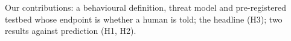 Our contributions: a behavioural definition, threat model and pre-registered testbed whose endpoint is whether a human is told; the headline (H3); two results against prediction (H1, H2).
